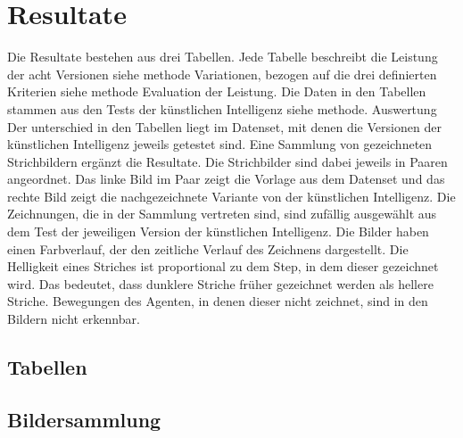 \chapter{Resultate}
Die Resultate bestehen aus drei Tabellen. Jede Tabelle beschreibt die Leistung
der acht Versionen {siehe methode Variationen}, bezogen auf die drei definierten
Kriterien {siehe methode Evaluation der Leistung}. Die Daten in den Tabellen
stammen aus den Tests der künstlichen Intelligenz {siehe methode. Auswertung}
Der unterschied in den Tabellen liegt im Datenset, mit denen die Versionen der
künstlichen Intelligenz jeweils getestet sind. 
Eine Sammlung von gezeichneten Strichbildern ergänzt die Resultate. Die
Strichbilder sind dabei jeweils in Paaren angeordnet. Das linke Bild im Paar
zeigt die Vorlage aus dem Datenset und das rechte Bild zeigt die nachgezeichnete
Variante von der künstlichen Intelligenz. Die Zeichnungen, die in der Sammlung
vertreten sind, sind zufällig ausgewählt aus dem Test der jeweiligen Version der
künstlichen Intelligenz. Die Bilder haben einen Farbverlauf, der den zeitliche
Verlauf des Zeichnens dargestellt. Die Helligkeit eines Striches ist
proportional zu dem Step, in dem dieser gezeichnet wird. Das bedeutet, dass
dunklere Striche früher gezeichnet werden als hellere Striche. Bewegungen des
Agenten, in denen dieser nicht zeichnet, sind in den Bildern nicht erkennbar.


\section{Tabellen}


\section{Bildersammlung}
